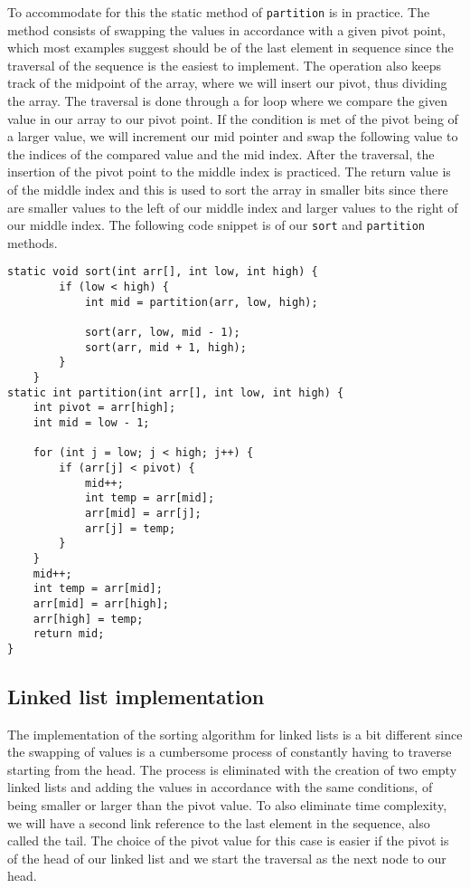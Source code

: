 \documentclass[a4paper,11pt]{article}
\begin{document}
        To accommodate for this the static method of \texttt{partition} is in practice. The method consists of swapping the values in accordance with a given pivot point, which most examples suggest should be of the last element in sequence since the traversal of the sequence is the easiest to implement. The operation also keeps track of the midpoint of the array, where we will insert our pivot, thus dividing the array. The traversal is done through a for loop where we compare the given value in our array to our pivot point. If the condition is met of the pivot being of a larger value, we will increment our mid pointer and swap the following value to the indices of the compared value and the mid index. After the traversal, the insertion of the pivot point to the middle index is practiced. The return value is of the middle index and this is used to sort the array in smaller bits since there are smaller values to the left of our middle index and larger values to the right of our middle index. The following code snippet is of our \texttt{sort} and \texttt{partition} methods. 

\begin{verbatim}
static void sort(int arr[], int low, int high) {
        if (low < high) {
            int mid = partition(arr, low, high);

            sort(arr, low, mid - 1);
            sort(arr, mid + 1, high);
        }
    }
static int partition(int arr[], int low, int high) {
    int pivot = arr[high];
    int mid = low - 1;
    
    for (int j = low; j < high; j++) {
        if (arr[j] < pivot) {
            mid++;
            int temp = arr[mid];
            arr[mid] = arr[j];
            arr[j] = temp;
        }
    }
    mid++;
    int temp = arr[mid];
    arr[mid] = arr[high];
    arr[high] = temp;
    return mid;
}
\end{verbatim}
        
    \subsection*{Linked list implementation}

        The implementation of the sorting algorithm for linked lists is a bit different since the swapping of values is a cumbersome process of constantly having to traverse starting from the head. The process is eliminated with the creation of two empty linked lists and adding the values in accordance with the same conditions, of being smaller or larger than the pivot value. To also eliminate time complexity, we will have a second link reference to the last element in the sequence, also called the tail. The choice of the pivot value for this case is easier if the pivot is of the head of our linked list and we start the traversal as the next node to our head.
\end{document}
